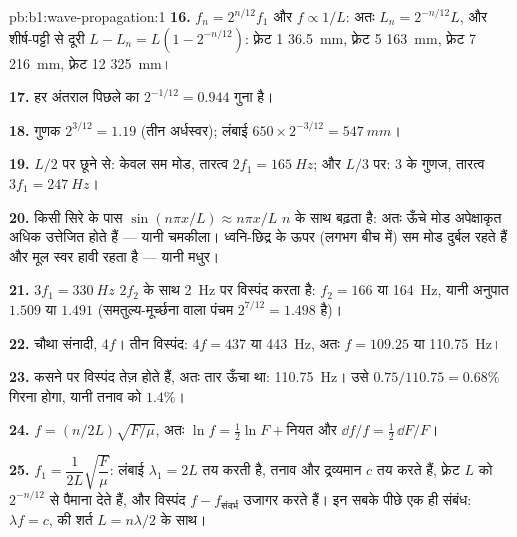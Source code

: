 \begin{solution}{pb:b1:wave-propagation:1}
\textbf{16.} $f_n = 2^{n/12}f_1$ और $f \propto 1/L$: अतः $L_n = 2^{-n/12}L$,
और शीर्ष-पट्टी से दूरी $L - L_n = L(1 - 2^{-n/12})$: फ़्रेट 1 \qty{36.5}{mm},
फ़्रेट 5 \qty{163}{mm}, फ़्रेट 7 \qty{216}{mm}, फ़्रेट 12 \qty{325}{mm}।

\textbf{17.} हर अंतराल पिछले का $2^{-1/12} = 0.944$ गुना है।

\textbf{18.} गुणक $2^{3/12} = 1.19$ (तीन अर्धस्वर); लंबाई
$650 \times 2^{-3/12} = \qty{547}{mm}$।

\textbf{19.} $L/2$ पर छूने से: केवल सम मोड, तारत्व $2f_1 =
\qty{165}{Hz}$; और $L/3$ पर: $3$ के गुणज, तारत्व $3f_1 = \qty{247}{Hz}$।

\textbf{20.} किसी सिरे के पास $\sin(n\pi x/L) \approx n\pi x/L$ $n$ के साथ
बढ़ता है: अतः ऊँचे मोड अपेक्षाकृत अधिक उत्तेजित होते हैं --- यानी चमकीला।
ध्वनि-छिद्र के ऊपर (लगभग बीच में) सम मोड दुर्बल रहते हैं और मूल स्वर हावी
रहता है --- यानी मधुर।

\textbf{21.} $3f_1 = \qty{330}{Hz}$ $2f_2$ के साथ \qty{2}{Hz} पर विस्पंद
करता है: $f_2 = 166$ या \qty{164}{Hz}, यानी अनुपात $1.509$ या $1.491$
(समतुल्य-मूर्च्छना वाला पंचम $2^{7/12} = 1.498$ है)।

\textbf{22.} चौथा संनादी, $4f$। तीन विस्पंद: $4f = 437$ या
\qty{443}{Hz}, अतः $f = 109.25$ या \qty{110.75}{Hz}।

\textbf{23.} कसने पर विस्पंद तेज़ होते हैं, अतः तार ऊँचा था:
\qty{110.75}{Hz}। उसे $0.75/110.75 = 0.68\%$ गिरना होगा, यानी
तनाव को $1.4\%$।

\textbf{24.} $f = (n/2L)\sqrt{F/\mu}$, अतः $\ln f = \tfrac12\ln F + \text{नियत}$
और $\dd f/f = \tfrac12\,\dd F/F$।

\textbf{25.} $f_1 = \dfrac{1}{2L}\sqrt{\dfrac{F}{\mu}}$: लंबाई
$\lambda_1 = 2L$ तय करती है, तनाव और द्रव्यमान $c$ तय करते हैं, फ़्रेट $L$ को
$2^{-n/12}$ से पैमाना देते हैं, और विस्पंद $f - f_{\text{संदर्भ}}$ उजागर करते
हैं। इन सबके पीछे एक ही संबंध: $\lambda f = c$,  की शर्त $L = n\lambda/2$ के साथ।
\end{solution}
